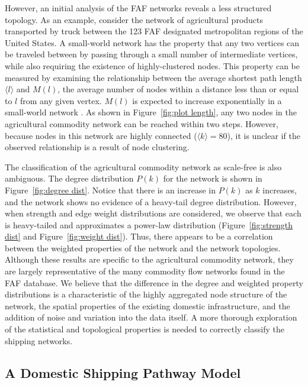 \documentclass[12pt]{article}
\begin{document}
However, an initial analysis of the FAF networks reveals a less structured topology.  As an example, consider the network of agricultural products transported by truck between the 123 FAF designated metropolitan regions of the United States.  A small-world network has the property that any two vertices can be traveled between by passing through a small number of intermediate vertices, while also requiring the existence of highly-clustered nodes.  This property can be measured by examining the relationship between the average shortest path length $\big \langle l \big \rangle$ and $M(l)$, the average number of nodes within a distance less than or equal to $l$ from any given vertex.  $M(l)$ is expected to increase exponentially in a small-world network \citep{Barrat2008}.  As shown in Figure~\ref{fig:plot length}, any two nodes in the agricultural commodity network can be reached within two steps.  However, because nodes in this network are highly connected ($\big \langle k \big \rangle = 80$), it is unclear if the observed relationship is a result of node clustering.  

The classification of the agricultural commodity network as scale-free is also ambiguous.  The degree distribution $P(k)$ for the network is shown in Figure~\ref{fig:degree dist}.  Notice that there is an increase in $P(k)$ as $k$ increases, and the network shows no evidence of a heavy-tail degree distribution.  However, when strength and edge weight distributions are considered, we observe that each is heavy-tailed and approximates a power-law distribution (Figure~\ref{fig:strength dist} and Figure~\ref{fig:weight dist}).  Thus, there appears to be a correlation between the weighted properties of the network and the network topologies.  Although these results are specific to the agricultural commodity network, they are largely representative of the many commodity flow networks found in the FAF database.  We believe that the difference in the degree and weighted property distributions is a characteristic of the highly aggregated node structure of the network, the spatial properties of the existing domestic infrastructure, and the addition of noise and variation into the data itself. A more thorough exploration of the statistical and topological properties is needed to correctly classify the shipping networks.

\subsection*{A Domestic Shipping Pathway Model}
\end{document}
